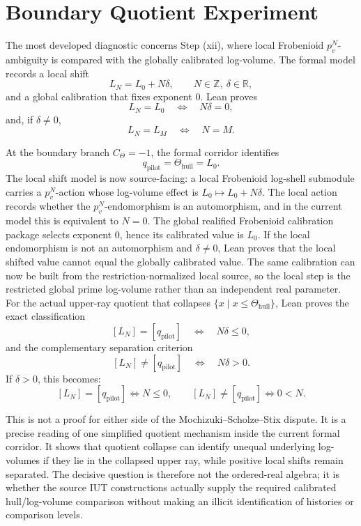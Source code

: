 \documentclass[11pt]{article}
\newcommand{\IUT}{IUT}
\newcommand{\Lean}{Lean}
\theoremstyle{plain}
\theoremstyle{definition}
\theoremstyle{remark}
\begin{document}
\section{Boundary Quotient Experiment}

The most developed diagnostic concerns Step (xii), where local Frobenioid
\(p_v^N\)-ambiguity is compared with the globally calibrated log-volume.  The
formal model records a local shift
\[
  L_N=L_0+N\delta,\qquad N\in\mathbb{Z},\ \delta\in\mathbb{R},
\]
and a global calibration that fixes exponent \(0\).  \Lean{} proves
\[
  L_N=L_0 \quad\Longleftrightarrow\quad N\delta=0,
\]
and, if \(\delta\ne0\),
\[
  L_N=L_M \quad\Longleftrightarrow\quad N=M .
\]

At the boundary branch \(C_\Theta=-1\), the formal corridor identifies
\[
  q_{\mathrm{pilot}}=\Theta_{\mathrm{hull}}=L_0 .
\]
The local shift model is now source-facing: a local Frobenioid log-shell
submodule carries a \(p_v^N\)-action whose log-volume effect is
\(L_0\mapsto L_0+N\delta\).  The local action records whether the
\(p_v^N\)-endomorphism is an automorphism, and in the current model this is
equivalent to \(N=0\).  The global realified Frobenioid calibration package
selects exponent \(0\), hence its calibrated value is \(L_0\).  If the local
endomorphism is not an automorphism and \(\delta\ne0\), \Lean{} proves that the
local shifted value cannot equal the globally calibrated value.  The same
calibration can now be built from the restriction-normalized local source, so
the local step is the restricted global prime log-volume rather than an
independent real parameter.
For the actual upper-ray quotient that collapses
\(\{x\mid x\le \Theta_{\mathrm{hull}}\}\), \Lean{} proves the exact
classification
\[
  [L_N]=[q_{\mathrm{pilot}}]
  \quad\Longleftrightarrow\quad
  N\delta\le0,
\]
and the complementary separation criterion
\[
  [L_N]\ne[q_{\mathrm{pilot}}]
  \quad\Longleftrightarrow\quad
  N\delta>0.
\]
If \(\delta>0\), this becomes:
\[
  [L_N]=[q_{\mathrm{pilot}}]\Longleftrightarrow N\le0,\qquad
  [L_N]\ne[q_{\mathrm{pilot}}]\Longleftrightarrow 0<N .
\]

This is not a proof for either side of the Mochizuki--Scholze--Stix dispute.
It is a precise reading of one simplified quotient mechanism inside the current
formal corridor.  It shows that quotient collapse can identify unequal
underlying log-volumes if they lie in the collapsed upper ray, while positive
local shifts remain separated.  The decisive question is therefore not the
ordered-real algebra; it is whether the source \IUT{} constructions actually
supply the required calibrated hull/log-volume comparison without making an
illicit identification of histories or comparison levels.
\end{document}
